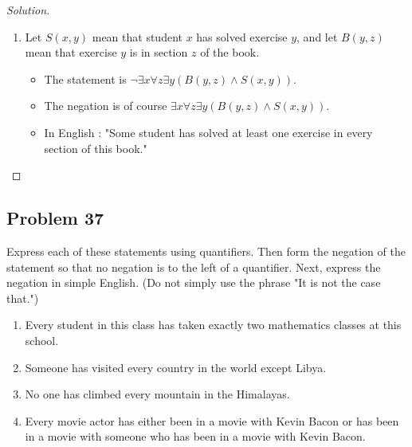 \documentclass{article}
\newenvironment{solution}{\renewcommand\qedsymbol{}\begin{proof}[Solution]}{\end{proof}}
\begin{document}
\begin{solution}
\begin{enumerate}[leftmargin=16pt, topsep = 8pt]
\item Let $S(x,y)$ mean that student $x$ has solved exercise $y$, and let $B(y,z)$ mean that exercise $y$ is in section $z$ of the book.
\begin{itemize}[leftmargin=0pt, topsep = 0pt]
\item The statement is $\neg \exists x \forall z \exists y(B(y,z) \land S(x,y))$.
\item The negation is of course $\exists x \forall z \exists y(B(y,z) \land S(x,y))$.
\item In English : "Some student has solved at least one exercise in every section of this book."
\end{itemize}
\end{enumerate}
\end{solution}

\subsection*{Problem 37}
Express each of these statements using quantifiers. Then form the negation of the statement so that no negation is to the left of a quantifier. Next, express the negation in simple English. (Do not simply use the phrase "It is not the case that.")

\begin{enumerate}[leftmargin=16pt, topsep = 8pt]
\item Every student in this class has taken exactly two mathematics classes at this school.
\item Someone has visited every country in the world except Libya.
\item No one has climbed every mountain in the Himalayas.
\item Every movie actor has either been in a movie with Kevin Bacon or has been in a movie with someone who has been in a movie with Kevin Bacon.
\end{enumerate}
\end{document}

